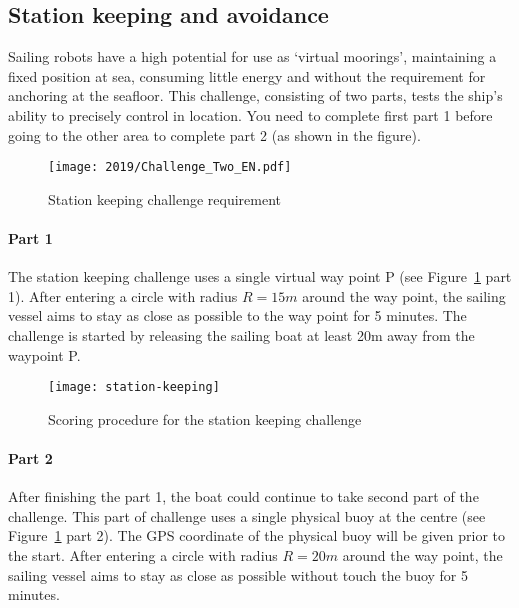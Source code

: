 \documentclass[12pt]{article}
\begin{document}
\subsection{Station keeping and avoidance}
Sailing robots have a high potential for use as `virtual moorings', maintaining
a fixed position at sea, consuming little energy and without the requirement for
anchoring at the seafloor.
This challenge, consisting of two parts, tests the ship's ability to precisely control in location. 
You need to complete first part 1 before going to the other area to complete part 2 (as shown in the figure). 

\begin{figure}[H]
  \centering
  \texttt{[image: 2019/Challenge\_Two\_EN.pdf]}
  \caption{Station keeping challenge requirement}
  \label{fig:stationkeeping_requirement}
\end{figure}

\paragraph{Part 1}

The station keeping challenge uses a single virtual way point P
(see Figure~\ref{fig:stationkeeping_requirement} part 1). 
After entering a circle with radius $R=15m$ around the way point, the 
sailing vessel aims to stay as close as possible to the way point for 5 minutes.
The challenge is started by releasing the sailing boat at least 20m away
from the waypoint P.


\begin{figure}[H]
  \centering
  \texttt{[image: station-keeping]}
  \caption{Scoring procedure for the station keeping challenge}
  \label{fig:stationkeeping}
\end{figure}

\paragraph{Part 2}

After finishing the part 1, the boat could continue to take second part of the challenge.
This part of challenge uses a single physical buoy at the centre (see Figure~\ref{fig:stationkeeping_requirement} part 2). 
The GPS coordinate of the physical buoy will be given prior to the start. 
After entering a circle with radius $R=20m$ around the way point, the 
sailing vessel aims to stay as close as possible without touch the buoy for 5 minutes.
\end{document}
